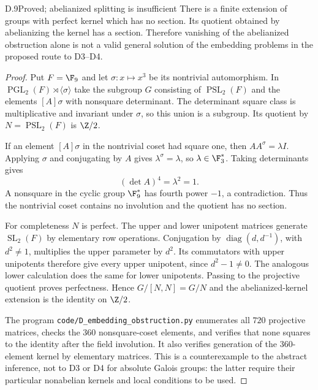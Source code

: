 \begin{claim}{D.9}{Proved; abelianized splitting is insufficient}
There is a finite extension of groups with perfect kernel which
has no section. Its quotient obtained by abelianizing the kernel
has a section. Therefore vanishing of the abelianized obstruction
alone is not a valid general solution of the embedding problems
in the proposed route to D3--D4.
\end{claim}
\begin{proof}
Put $F=\F_9$ and let $\sigma:x\mapsto x^3$ be its nontrivial
automorphism. In $\operatorname{PGL}_2(F)\rtimes\langle\sigma\rangle$
take the subgroup $G$ consisting of $\operatorname{PSL}_2(F)$
and the elements $[A]\sigma$ with nonsquare determinant.
The determinant square class is multiplicative and invariant
under $\sigma$, so this union is a subgroup. Its quotient by
$N=\operatorname{PSL}_2(F)$ is $\Z/2$.

If an element $[A]\sigma$ in the nontrivial coset had square one,
then $A A^\sigma=\lambda I$. Applying $\sigma$ and conjugating
by $A$ gives $\lambda^\sigma=\lambda$, so
$\lambda\in\F_3^*$. Taking determinants gives
\[
              (\det A)^4=\lambda^2=1.
\]
A nonsquare in the cyclic group $\F_9^*$ has fourth power
$-1$, a contradiction. Thus the nontrivial coset contains no
involution and the quotient has no section.

For completeness $N$ is perfect. The upper and lower unipotent
matrices generate $\operatorname{SL}_2(F)$ by elementary row
operations. Conjugation by $\operatorname{diag}(d,d^{-1})$,
with $d^2\ne1$, multiplies the upper parameter by $d^2$.
Its commutators with upper unipotents therefore give every upper
unipotent, since $d^2-1\ne0$. The analogous lower calculation
does the same for lower unipotents. Passing to the projective
quotient proves perfectness. Hence $G/[N,N]=G/N$ and the
abelianized-kernel extension is the identity on $\Z/2$.

The program \texttt{code/D\_embedding\_obstruction.py}
enumerates all $720$ projective matrices, checks the $360$
nonsquare-coset elements, and verifies that none squares to the
identity after the field involution. It also verifies generation
of the $360$-element kernel by elementary matrices. This is a
counterexample to the abstract inference, not to D3 or D4 for
absolute Galois groups: the latter require their particular
nonabelian kernels and local conditions to be used.
\end{proof}



